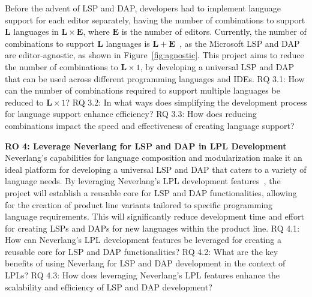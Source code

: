 \hfill \break
Before the advent of LSP and DAP, developers had to implement language support for each editor separately, having the number of combinations to support $\mathbf{L}$ languages in $\mathbf{L} \times \mathbf{E}$, where $\mathbf{E}$ is the number of editors.
Currently, the number of combinations to support $\mathbf{L}$ languages is $\mathbf{L} + \mathbf{E}$~\cite{Rodriguez-Echeverria18a}, as the Microsoft LSP and DAP are editor-agnostic, as shown in Figure~\ref{fig:agnostic}. This project aims to reduce the number of combinations to $\mathbf{L} \times 1$, by developing a universal LSP and DAP that can be used across different programming languages and IDEs.
\hfill \break
\textsf{\hypertarget{rq31}{RQ 3.1}}: How can the number of combinations required to support multiple languages be reduced to $\mathbf{L} \times 1$?
\hfill \break
\textsf{\hypertarget{rq32}{RQ 3.2}}: In what ways does simplifying the development process for language support enhance efficiency?
\hfill \break
\textsf{\hypertarget{rq33}{RQ 3.3}}: How does reducing combinations impact the speed and effectiveness of creating language support?

\hfill \break
\noindent
\textbf{\hypertarget{ro4}{RO 4}: Leverage Neverlang for LSP and DAP in LPL Development}
\hfill \break
Neverlang's capabilities for language composition and modularization make it an ideal platform for developing a universal LSP and DAP that caters to a variety of language needs. By leveraging Neverlang's LPL development features~\cite{Cazzola20}, the project will establish a reusable core for LSP and DAP functionalities, allowing for the creation of product line variants tailored to specific programming language requirements. This will significantly reduce development time and effort for creating LSPs and DAPs for new languages within the product line.
\hfill \break
\textsf{\hypertarget{rq41}{RQ 4.1}}: How can Neverlang's LPL development features be leveraged for creating a reusable core for LSP and DAP functionalities?
\hfill \break
\textsf{\hypertarget{rq42}{RQ 4.2}}: What are the key benefits of using Neverlang for LSP and DAP development in the context of LPLs?
\hfill \break
\textsf{\hypertarget{rq43}{RQ 4.3}}: How does leveraging Neverlang's LPL features enhance the scalability and efficiency of LSP and DAP development?
